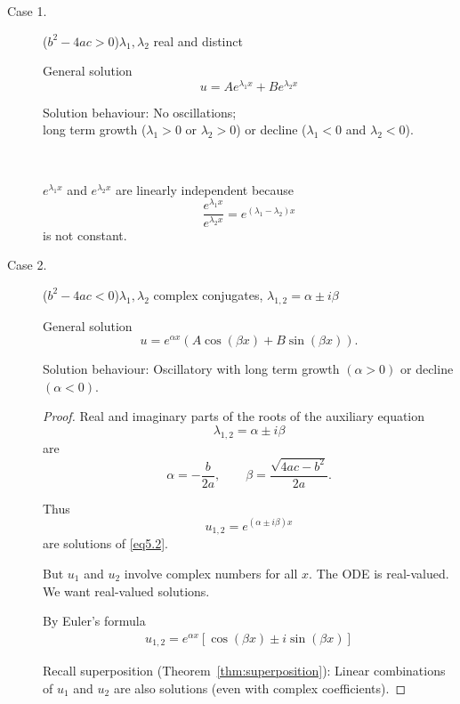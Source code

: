 \begin{description}
 \item[Case 1.]  ($b^2-4ac>0$)\quad $\lambda_1, \lambda_2$ real and distinct
 
 General solution
 \[
  u = A e^{\lambda_1x} + B e^{\lambda_2 x}
 \]
 
 Solution behaviour: No oscillations;\\
 long term growth ($\lambda_1>0$ or $\lambda_2>0$) or decline ($\lambda_1<0$ and $\lambda_2<0$).
 \begin{note}\

  $e^{\lambda_1x}$ and $e^{\lambda_2x}$ are linearly independent because 
  \[
   \dfrac{e^{\lambda_1x}}{e^{\lambda_2x}} = e^{(\lambda_1-\lambda_2)x}
  \]
is not constant.
 \end{note}


 \item[Case 2.] ($b^2-4ac<0$)\quad $\lambda_1, \lambda_2$ complex conjugates, $\lambda_{1,2} = \alpha \pm i\beta$
 
 General solution
 \[
  u = e^{\alpha x} (A \cos (\beta x) + B \sin (\beta x)).
 \]

Solution behaviour: Oscillatory with long term growth $(\alpha > 0)$ or decline $(\alpha < 0)$.

\begin{proof}

Real and imaginary parts of the roots of the auxiliary equation
\[
\lambda_{1,2} = \alpha \pm i\beta
\]
are $$\alpha = -\dfrac{b}{2a},\qquad\beta=\dfrac{\sqrt{4ac-b^2}}{2a}.$$

Thus
\[
 u_{1,2} = e^{(\alpha \pm i\beta)x}
\]
are solutions of \eqref{eq5.2}.

But $u_1$ and $u_2$ involve complex numbers for all $x$. The ODE is real-valued. We want real-valued solutions.

By Euler's formula
%
\begin{eqnarray*}
 u_{1,2}  = e^{\alpha x} [\cos(\beta x) \pm i \sin(\beta x)]
\end{eqnarray*}

Recall superposition (Theorem~\ref{thm:superposition}): Linear combinations of $u_1$ and $u_2$ are also solutions (even with complex coefficients).


\end{proof}
\end{description}
